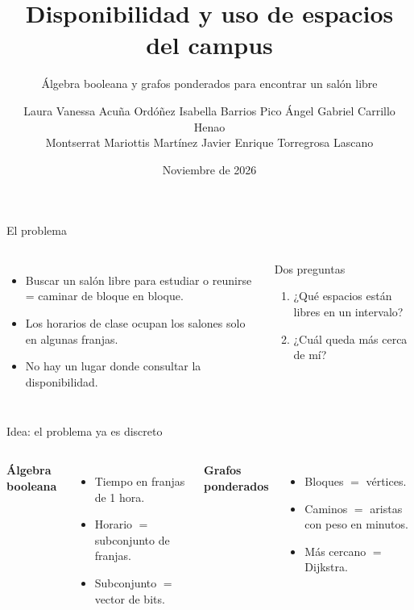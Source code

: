 \documentclass[aspectratio=169,11pt]{beamer}
\title{Disponibilidad y uso de espacios del campus}
\subtitle{Álgebra booleana y grafos ponderados para encontrar un salón libre}
\author{\small Laura Vanessa Acuña Ordóñez \quad Isabella Barrios Pico \quad Ángel Gabriel Carrillo Henao\\
Montserrat Mariottis Martínez \quad Javier Enrique Torregrosa Lascano}
\institute{MAT 4021 Matemáticas Discretas -- Universidad del Norte\\[2pt]
\footnotesize\repo}
\date{Noviembre de 2026}
\begin{document}
\maketitle

\begin{frame}{El problema}
\begin{columns}[T]
\begin{itemize}
  \item Buscar un salón libre para estudiar o reunirse = caminar de bloque en bloque.
  \item Los horarios de clase ocupan los salones solo en algunas franjas.
  \item No hay un lugar donde consultar la disponibilidad.
\end{itemize}
\begin{block}{Dos preguntas}
\begin{enumerate}
  \item ¿Qué espacios están \alert{libres} en un intervalo?
  \item ¿Cuál queda \alert{más cerca} de mí?
\end{enumerate}
\end{block}
\end{columns}
\end{frame}

\begin{frame}{Idea: el problema ya es discreto}
\begin{columns}[T]
\textbf{Álgebra booleana}
\begin{itemize}
  \item Tiempo en franjas de 1 hora.
  \item Horario $=$ subconjunto de franjas.
  \item Subconjunto $=$ vector de bits.
\end{itemize}
\textbf{Grafos ponderados}
\begin{itemize}
  \item Bloques $=$ vértices.
  \item Caminos $=$ aristas con peso en minutos.
  \item Más cercano $=$ Dijkstra.
\end{itemize}
\end{columns}
\end{frame}
\end{document}
